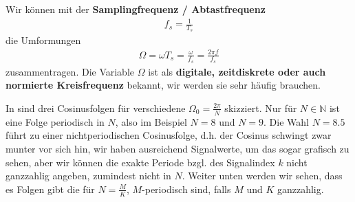 %
Wir können mit der \textbf{Samplingfrequenz / Abtastfrequenz}
\begin{align}
f_s=\frac{1}{T_s}
\end{align}
die Umformungen
\begin{align}
\Omega = \omega T_s = \frac{\omega}{f_s} = \frac{2\pi f}{f_s}
\end{align}
zusammentragen. Die Variable $\Omega$ ist als \textbf{digitale, zeitdiskrete oder auch
normierte Kreisfrequenz} bekannt, wir werden sie sehr häufig brauchen.

In  sind drei Cosinusfolgen für verschiedene
$\Omega_0=\frac{2\pi}{N}$ skizziert.
%
Nur für $N\in\mathbb{N}$ ist eine Folge periodisch in $N$, also
im Beispiel $N=8$ und $N=9$. Die Wahl $N=8.5$ führt zu einer nichtperiodischen
Cosinusfolge, d.h. der Cosinus schwingt zwar munter vor sich hin, wir haben
ausreichend Signalwerte, um das sogar grafisch zu sehen, aber wir
können die exakte Periode bzgl. des Signalindex $k$ nicht ganzzahlig angeben,
zumindest nicht in $N$. Weiter unten werden wir sehen, dass es Folgen gibt
die für $N=\frac{M}{K}$, $M$-periodisch sind, falls $M$ und $K$ ganzzahlig.

